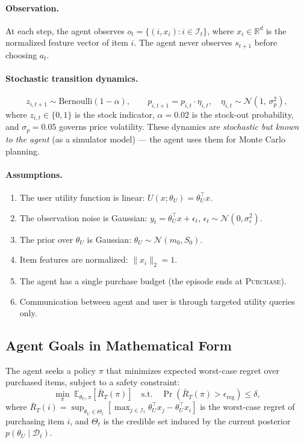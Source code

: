 \documentclass[11pt,letterpaper]{article}
\newcommand{\Purchase}{\textsc{Purchase}}
\newcommand{\thetaU}{\theta_U}
\newcommand{\epsreg}{\epsilon_{\mathrm{reg}}}
\newcommand{\Rbar}{\bar{R}}
\begin{document}
\paragraph{Observation.} At each step, the agent observes $o_t = \{(i, x_i) : i \in \mathcal{I}_t\}$, where $x_i \in \mathbb{R}^d$ is the normalized feature vector of item $i$.  The agent never observes $s_{t+1}$ before choosing $a_t$.

\paragraph{Stochastic transition dynamics.}  
\begin{equation}
    z_{i,t+1} \sim \mathrm{Bernoulli}(1 - \alpha), \qquad
    p_{i,t+1} = p_{i,t} \cdot \eta_{i,t}, \quad \eta_{i,t} \sim \mathcal{N}(1,\, \sigma_p^2),
\end{equation}
where $z_{i,t} \in \{0,1\}$ is the stock indicator, $\alpha = 0.02$ is the stock-out probability, and $\sigma_p = 0.05$ governs price volatility.  These dynamics are \emph{stochastic but known to the agent} (as a simulator model) --- the agent uses them for Monte Carlo planning.

\paragraph{Assumptions.}
\begin{enumerate}[nosep]
    \item The user utility function is linear: $U(x; \thetaU) = \thetaU^\top x$.
    \item The observation noise is Gaussian: $y_t = \thetaU^\top x + \epsilon_t$, $\epsilon_t \sim \mathcal{N}(0, \sigma_\epsilon^2)$.
    \item The prior over $\thetaU$ is Gaussian: $\thetaU \sim \mathcal{N}(m_0, S_0)$.
    \item Item features are normalized: $\|x_i\|_2 = 1$.
    \item The agent has a single purchase budget (the episode ends at \Purchase).
    \item Communication between agent and user is through targeted utility queries only.
\end{enumerate}

\subsection{Agent Goals in Mathematical Form}

The agent seeks a policy $\pi$ that minimizes expected worst-case regret over purchased items, subject to a safety constraint:
\begin{equation}
    \min_\pi \; \mathbb{E}_{\thetaU, \pi}\left[ \Rbar_T(\pi) \right]
    \quad \text{s.t.} \quad
    \Pr\!\left(\Rbar_T(\pi) > \epsreg\right) \leq \delta,
\end{equation}
where $\Rbar_T(i) = \sup_{\thetaU \in \Theta_t} \left[\max_{j \in \mathcal{I}_t} \thetaU^\top x_j - \thetaU^\top x_i\right]$ is the worst-case regret of purchasing item $i$, and $\Theta_t$ is the credible set induced by the current posterior $p(\thetaU \mid \mathcal{D}_t)$.
\end{document}
